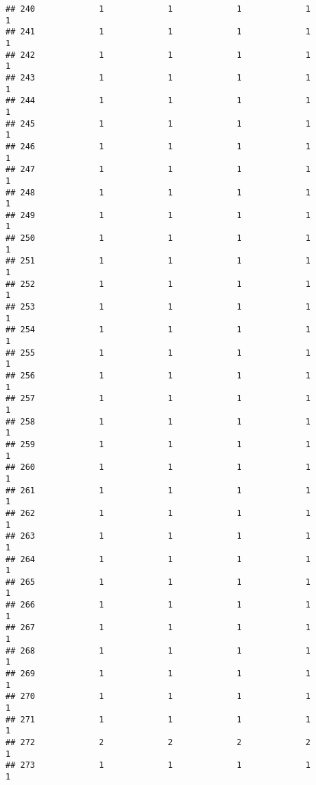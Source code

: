 \documentclass[
]{article}
\begin{document}
\begin{verbatim}
## 240             1             1             1             1             1
## 241             1             1             1             1             1
## 242             1             1             1             1             1
## 243             1             1             1             1             1
## 244             1             1             1             1             1
## 245             1             1             1             1             1
## 246             1             1             1             1             1
## 247             1             1             1             1             1
## 248             1             1             1             1             1
## 249             1             1             1             1             1
## 250             1             1             1             1             1
## 251             1             1             1             1             1
## 252             1             1             1             1             1
## 253             1             1             1             1             1
## 254             1             1             1             1             1
## 255             1             1             1             1             1
## 256             1             1             1             1             1
## 257             1             1             1             1             1
## 258             1             1             1             1             1
## 259             1             1             1             1             1
## 260             1             1             1             1             1
## 261             1             1             1             1             1
## 262             1             1             1             1             1
## 263             1             1             1             1             1
## 264             1             1             1             1             1
## 265             1             1             1             1             1
## 266             1             1             1             1             1
## 267             1             1             1             1             1
## 268             1             1             1             1             1
## 269             1             1             1             1             1
## 270             1             1             1             1             1
## 271             1             1             1             1             1
## 272             2             2             2             2             1
## 273             1             1             1             1             1

\end{verbatim}
\end{document}
